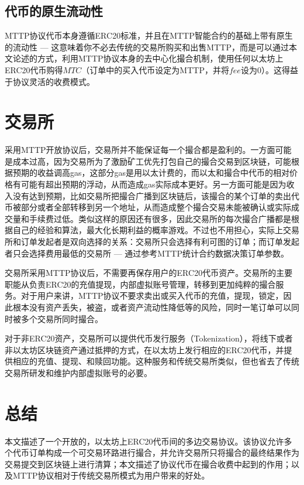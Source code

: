 \documentclass[UTF8,nofonts]{ctexart}
\begin{document}
\subsection{代币的原生流动性}

MTTP协议代币本身遵循ERC20标准，并且在MTTP智能合约的基础上带有原生的流动性 --- 这意味着你不必去传统的交易所购买和出售MTTP，而是可以通过本文论述的方式，利用MTTP协议本身的去中心化撮合机制，使用任何以太坊上ERC20代币购得$MTC$（订单中的买入代币设定为MTTP，并将$fee$设为0）。这得益于协议灵活的收费模式。

\section{交易所\label{sec:exchange}}

采用MTTP开放协议后，交易所并不能保证每一个撮合都是盈利的。一方面可能是成本过高，因为交易所为了激励矿工优先打包自己的撮合交易到区块链，可能根据预期的收益调高gas，这部分gas是用以太计费的，而以太和撮合中代币的相对价格有可能有超出预期的浮动，从而造成gas实际成本更好。另一方面可能是因为收入没有达到预期，比如交易所把撮合广播到区块链后，该撮合的某个订单的卖出代币被部分或者全部转移到另一个地址，从而造成整个撮合交易未能被确认或实际成交量和手续费过低。类似这样的原因还有很多，因此交易所的每次撮合广播都是根据自己的经验和算法，最大化长期利益的概率游戏。不过也不用担心，实际上交易所和订单发起者是双向选择的关系：交易所只会选择有利可图的订单；而订单发起者只会选择费用最低的交易所 --- 通过参考MTTP统计合约数据决策订单参数。

交易所采用MTTP协议后，不需要再保存用户的ERC20代币资产。交易所的主要职能从负责ERC20的充值提现，内部虚拟账号管理，转移到更加纯粹的撮合服务。对于用户来讲，MTTP协议不要求卖出或买入代币的充值，提现，锁定，因此根本没有资产丢失，被盗，或者资产流动性降低等的风险，同时一笔订单可以同时被多个交易所同时撮合。

对于非ERC20资产，交易所可以提供代币发行服务（Tokenization），将线下或者非以太坊区块链资产通过抵押的方式，在以太坊上发行相应的ERC20代币，并提供相应的充值、提现、和赎回功能。这种服务和传统交易所类似，但也省去了传统交易所研发和维护内部虚拟账号的必要。

\section{总结\label{sec:summary}}

本文描述了一个开放的，以太坊上ERC20代币间的多边交易协议。该协议允许多个代币订单构成一个可交易环路进行撮合，并允许交易所只将撮合的最终结果作为交易提交到区块链上进行清算；本文描述了协议代币在撮合收费中起到的作用；以及MTTP协议相对于传统交易所模式为用户带来的好处。
\end{document}
